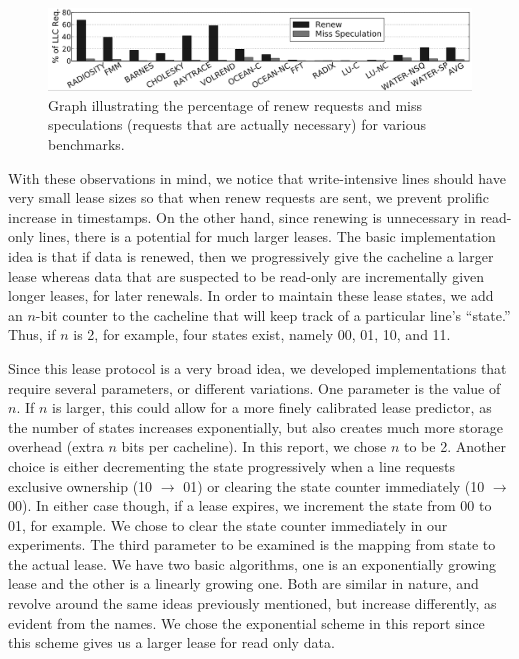 \documentclass[12pt]{article}
\begin{document}
	\begin{figure}
		\begin{center}
			\includegraphics[width=16cm]{image1.png}
			\caption{Graph illustrating the percentage of renew requests and miss speculations (requests that are actually necessary) for various benchmarks. }
			\label{fig:renewals}
		\end{center}
	\end{figure}
	
	With these observations in mind, we notice that write-intensive lines 
	should have very small lease sizes so that when renew requests are 
	sent, we prevent prolific increase in timestamps. On the other hand, 
	since renewing is unnecessary in read-only lines, there is a potential 
	for much larger leases. The basic implementation idea is that if data
	is renewed, then we progressively give the cacheline a larger lease 
	whereas data that are suspected to be read-only are incrementally 
	given longer leases, for later renewals. In order to maintain these 
	lease states, we add an $n$-bit counter to the cacheline that will 
	keep track of a particular line's “state.” Thus, if $n$ is 2, for 
	example, four states exist, namely 00, 01, 10, and 11. 
	
	Since this lease protocol is a very broad idea, we developed 
	implementations that require several parameters, or different  %
	variations. One parameter is the value of $n$. If $n$ is larger, this 
	could allow for a more finely calibrated lease predictor, as the number of %
	states increases exponentially, but also creates much more storage 
	overhead (extra $n$ bits per cacheline). In this report, we chose $n$ 
	to be 2. Another choice is either decrementing the state progressively 
	when a line requests exclusive ownership (10 $\rightarrow$ 01) or 
	clearing the state counter immediately (10 $\rightarrow$ 00). In 
	either case though, if a lease expires, we increment the state from 00 
	to 01, for example. We chose to clear the state counter immediately in 
	our experiments. The third parameter to be examined is the mapping 
	from state to the actual lease. We have two basic algorithms, one is 
	an exponentially growing lease and the other is a linearly growing 
	one.  Both are similar in nature, and revolve around the same ideas 
	previously mentioned, but increase differently, as evident from the 
	names. We chose the exponential scheme in this report since this 
	scheme gives us a larger lease for read only data.
	
\end{document}
